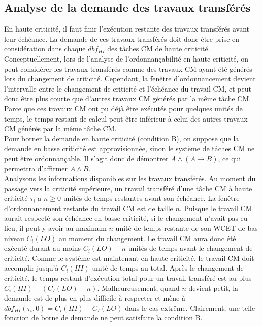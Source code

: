 \documentclass[12pt,a4paper,oneside]{book}
\theoremstyle{break}
\theoremstyle{breakplain}
\begin{document}
\subsection{Analyse de la demande des travaux transférés}
En haute criticité, il faut finir l'exécution restante des travaux transférés avant leur échéance. La demande de ces travaux transférés doit donc être prise en considération dans chaque $dbf_{HI}$ des tâches CM de haute criticité. Conceptuellement, lors de l'analyse de l'ordonnançabilité en haute criticité, on peut considérer les travaux transférés comme des travaux CM ayant été générés lors du changement de criticité. Cependant, la fenêtre d'ordonnancement devient l'intervalle entre le changement de criticité et l'échéance du travail CM, et peut donc être plus courte que d'autres travaux CM générés par la même tâche CM. Parce que ces travaux CM ont pu déjà être exécutés pour quelques unités de temps, le temps restant de calcul peut être inférieur à celui des autres travaux CM générés par la même tâche CM.\\

Pour borner la demande en haute criticité (condition B), on suppose que la demande en basse criticité est approvisionnée, sinon le système de tâches CM ne peut être ordonnançable. Il s'agit donc de démontrer $A \wedge (A \rightarrow B)$, ce qui permettra d'affirmer $A\wedge B$.\\

Analysons les informations disponibles sur les travaux transférés. Au moment du passage vers la criticité supérieure, un travail transféré d'une tâche CM à haute criticité $\tau_i$ a $n\ge 0$ unités de temps restantes avant son échéance. La fenêtre d'ordonnancement restante du travail CM est de taille $n$. Puisque le travail CM aurait respecté son échéance en basse criticité, si le changement n'avait pas eu lieu, il peut y avoir au maximum $n$ unité de temps restante de son WCET de bas niveau $C_i(LO)$ au moment du changement. Le travail CM aura donc été exécuté durant au moins $C_i(LO) -n$ unités de temps avant le changement de criticité. Comme le système est maintenant en haute criticité, le travail CM doit accomplir jusqu'à $C_i(HI)$ unité de temps au total. Après le changement de criticité, le temps restant d'exécution total pour un travail transféré est au plus $C_i(HI) - (C_I(LO)-n)$. Malheureusement, quand $n$ devient petit, la demande est de plus en plus difficile à respecter et mène à $dbf_{HI}(\tau_i,0) = C_i(HI) - C_I(LO)$ dans le cas extrême. Clairement, une telle fonction de borne de demande ne peut satisfaire la condition B.
\end{document}

